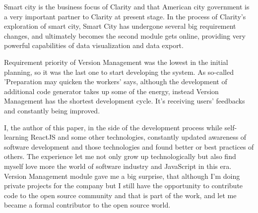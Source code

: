 Smart city is the business focus of Clarity and that American city government is a very important partner to Clarity at present stage. In the process of Clarity's exploration of smart city, Smart City has undergone several big requirement changes, and ultimately becomes the second module gets online, providing very powerful capabilities of data visualization and data export.

Requirement priority of Version Management was the lowest in the initial planning, so it was the last one to start developing the system. As so-called 'Preparation may quicken the workers' says, although the development of additional code generator takes up some of the energy, instead Version Management has the shortest development cycle. It's receiving users' feedbacks and constantly being improved.

I, the author of this paper, in the side of the development process while self-learning ReactJS and some other technologies, constantly updated awareness of software development and those technologies and found better or best practices of others. The experience let me not only grow up technologically but also find myself love more the world of software industry and JavaScript in this era. Version Management module gave me a big surprise, that although I'm doing private projects for the company but I still have the opportunity to contribute code to the open source community and that is part of the work, and let me became a formal contributor to the open source world.
